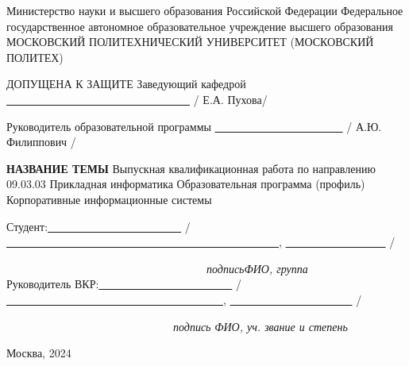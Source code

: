 
\singlespacing


\begin{center}
    Министерство науки и высшего образования Российской Федерации
    \bigbreak
    Федеральное государственное автономное образовательное учреждение
    высшего образования
    \bigbreak
    \guillemotleft МОСКОВСКИЙ ПОЛИТЕХНИЧЕСКИЙ УНИВЕРСИТЕТ\guillemotright
    \bigbreak
    (МОСКОВСКИЙ ПОЛИТЕХ)
    \bigbreak
    \bigbreak
    \bigbreak
\end{center}
\hfill
\begin{minipage}{0.46\linewidth}
    ДОПУЩЕНА К ЗАЩИТЕ
    \bigbreak
    Заведующий кафедрой
    \bigbreak
    \underline{\ \ \ \ \ \ \ \ \ \ \ \ \ \ \ \ \ \ \ \ \ \ \ \ \ \ \ \ \ \ \ \ \ } / Е.А. Пухова/
    \bigbreak
    \raggedright Руководитель образовательной программы
    \bigbreak
    \underline{\ \ \ \ \ \ \ \ \ \ \ \ \ \ \ \ \ \ \ \ \ \ \ } / А.Ю. Филиппович /
\end{minipage}
\bigbreak
\bigbreak
\bigbreak
\begin{center}
    \textbf{\guillemotleft НАЗВАНИЕ ТЕМЫ\guillemotright}
    \bigbreak
    \bigbreak
    \bigbreak
    \bigbreak
    Выпускная квалификационная работа
    \bigbreak
    по направлению 09.03.03 Прикладная информатика
    \bigbreak
    Образовательная программа (профиль)
    \bigbreak
    \guillemotleft Корпоративные информационные системы\guillemotright
    \bigbreak
    \bigbreak
    \bigbreak
    \bigbreak
\end{center}
Студент:\hfill \underline{\ \ \ \ \ \ \ \ \ \ \ \ \ \ \ \ \ \ \ \ \ \ \ \ }
 / \underline{\ \ \ \ \ \ \ \ \ \ \ \ \ \ \ \ \ \ \ \ \ \ \ \ \ \ \ \ \ \ \ \ \ \ \ \ \ \ \ \ \ \ \ \ \ \ \ \ \ },
 \underline{\ \ \ \ \ \ \ \ \ \ \ \ \ \ \ \ \ \ } /

\noindent
\ \ \ \ \ \ \ \ \ \ \ \ \ \ \ \ \ \ \ \ \ \ \ \ \ \ \ \ \ \ \ \ \ \ \ \ \textit{подпись}\hfill \textit{ФИО, группа}\ \ \ \ \ \ \ \ \
\bigbreak
\bigbreak
\bigbreak
\noindent
Руководитель ВКР:\hfill \underline{\ \ \ \ \ \ \ \ \ \ \ \ \ \ \ \ \ \ \ \ \ \ \ \ }
 / \underline{\ \ \ \ \ \ \ \ \ \ \ \ \ \ \ \ \ \ \ \ \ \ \ \ \ \ \ \ \ \ \ \ \ \ \ \ \ \ \ },
 \underline{\ \ \ \ \ \ \ \ \ \ \ \ \ \ \ \ \ \ \ \ \ \ } /

\noindent
\ \ \ \ \ \ \ \ \ \ \ \ \ \ \ \ \ \ \ \ \ \ \ \ \ \ \ \ \ \ \textit{подпись}
\hfill \textit{ФИО, уч. звание и степень}\ \ \ \ 
\vfill
\begin{center}
    Москва, 2024
\end{center}
\newpage

